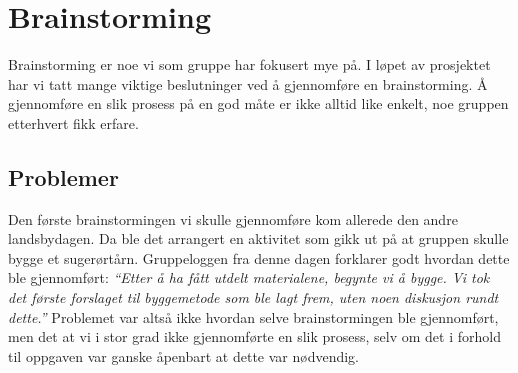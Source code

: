 \section{Brainstorming}
Brainstorming er noe vi som gruppe har fokusert mye på. I løpet av prosjektet har vi tatt mange viktige beslutninger ved å gjennomføre en brainstorming. Å gjennomføre en slik prosess på en god måte er ikke alltid like enkelt, noe gruppen etterhvert fikk erfare.
\subsection{Problemer}
Den første brainstormingen vi skulle gjennomføre kom allerede den andre landsbydagen. Da ble det arrangert en aktivitet som gikk ut på at gruppen skulle bygge et sugerørtårn. Gruppeloggen fra denne dagen forklarer godt hvordan dette ble gjennomført:
\newline
\emph{“Etter å ha fått utdelt materialene, begynte vi å bygge. Vi tok det første forslaget til byggemetode som ble lagt frem, uten noen diskusjon rundt dette.”} 
\newline
Problemet var altså ikke hvordan selve brainstormingen ble gjennomført, men det at vi i stor grad ikke gjennomførte en slik prosess, selv om det i forhold til oppgaven var ganske åpenbart at dette var nødvendig. 



